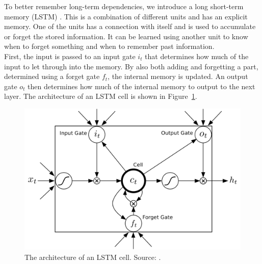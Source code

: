 To better remember long-term dependencies, we introduce a long short-term memory (LSTM) \parencite{Hochreiter1997LSTM}. This is a combination of different units and has an explicit memory. One of the units has a connection with itself and is used to accumulate or forget the stored information. It can be learned using another unit to know when to forget something and when to remember past information.\\
First, the input is passed to an input gate $i_t$ that determines how much of the input to let through into the memory. By also both adding and forgetting a part, determined using a forget gate $f_t$, the internal memory is updated. An output gate $o_t$ then determines how much of the internal memory to output to the next layer.
The architecture of an LSTM cell is shown in Figure~\ref{fig:lstm}.
\begin{figure}[htb]
    \centering
    \includegraphics[width=.75\linewidth]{images/lstm.png}
    \caption[Long short-term memory cell]{The architecture of an LSTM cell. Source: \cite{journals/corr/Graves13}.}
    \label{fig:lstm}
\end{figure}

